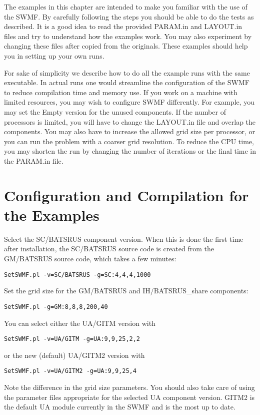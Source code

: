 The examples in this chapter are intended to make you familiar
with the use of the SWMF. By carefully following the steps you should
be able to do the tests as described. It is a good idea to read the
provided PARAM.in and LAYOUT.in files and try to understand how
the examples work. You may also experiment by changing these files
after copied from the originals. These examples should help you
in setting up your own runs.

For sake of simplicity we describe how to do all the example runs with the
same executable. In actual runs one would streamline the configuration
of the SWMF to reduce compilation time and memory use. If you work
on a machine with limited resources, you may wish to configure SWMF
differently. For example, you may set the Empty version for the unused
components. If the number of processors is limited, you will have to
change the LAYOUT.in file and overlap the components. You may also have to 
increase the allowed grid size per processor, or you can run the problem with 
a coarser grid resolution. To reduce the CPU time, you may shorten the 
run by changing the number of iterations or the final time in the 
PARAM.in file.

\section{Configuration and Compilation for the Examples}

Select the SC/BATSRUS component version. When this is done the first time
after installation, the SC/BATSRUS source code is created from the GM/BATSRUS
source code, which takes a few minutes:
\begin{verbatim}
SetSWMF.pl -v=SC/BATSRUS -g=SC:4,4,4,1000
\end{verbatim}
Set the grid size for the GM/BATSRUS and IH/BATSRUS\_share components:
\begin{verbatim}
SetSWMF.pl -g=GM:8,8,8,200,40
\end{verbatim}
You can select either the UA/GITM version with
\begin{verbatim}
SetSWMF.pl -v=UA/GITM -g=UA:9,9,25,2,2
\end{verbatim}
or the new (default) UA/GITM2 version with
\begin{verbatim}
SetSWMF.pl -v=UA/GITM2 -g=UA:9,9,25,4
\end{verbatim}
Note the difference in the grid size parameters.
You should also take care of using the parameter files appropriate for
the selected UA component version.  GITM2 is the default UA module
currently in the SWMF and is the most up to date.


